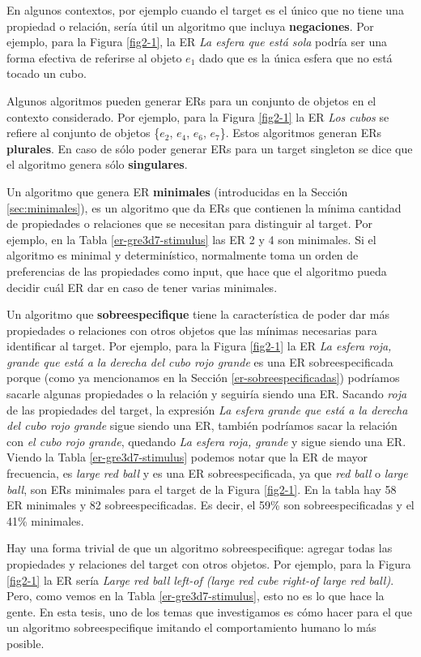 En algunos contextos, por ejemplo cuando el target es el \'unico que no tiene una propiedad o relaci\'on, ser\'ia \'util un algoritmo que incluya {\bf negaciones}. Por ejemplo, para la Figura \ref{fig2-1}, la ER {\it La esfera que est\'a sola} podr\'ia ser 
una forma efectiva de referirse al objeto $e_1$ dado que es la \'unica esfera que no est\'a tocado un cubo.

Algunos algoritmos pueden generar ERs para un conjunto de objetos en el contexto considerado. Por ejemplo, para la Figura \ref{fig2-1} la ER {\it Los cubos} se refiere  al conjunto de objetos \{$e_2$, $e_4$, $e_6$, $e_7$\}. Estos algoritmos generan ERs {\bf plurales}. En caso de s\'olo poder generar ERs para un target singleton se dice que el algoritmo genera s\'olo {\bf singulares}.

Un algoritmo que genera ER {\bf minimales} (introducidas en la Secci\'on \ref{sec:minimales}), es un algoritmo que da ERs que contienen la m\'inima cantidad de propiedades o relaciones que se necesitan para distinguir al target. Por ejemplo, en la Tabla \ref{er-gre3d7-stimulus} las ER 2 y 4 son minimales. Si el algoritmo es minimal y determin\'istico, normalmente toma un orden de preferencias de las propiedades como input, que hace que el algoritmo pueda decidir cu\'al ER dar en caso de tener varias minimales.

Un algoritmo que {\bf sobreespecifique} tiene la caracter\'istica de poder dar m\'as propiedades o relaciones con otros objetos que las m\'inimas necesarias para identificar al target. Por ejemplo, para la Figura \ref{fig2-1} la ER {\it La esfera roja, grande que est\'a a la derecha del cubo rojo grande} es una ER sobreespecificada porque (como ya mencionamos en la Secci\'on \ref{er-sobreespecificadas}) podr\'iamos sacarle algunas propiedades o la relaci\'on y seguir\'ia siendo una ER. Sacando {\it roja} de las propiedades del target, la expresi\'on {\it La esfera grande que est\'a a la derecha del cubo rojo grande} sigue siendo una ER, tambi\'en podr\'iamos sacar la relaci\'on con {\it el cubo rojo grande}, quedando {\it La esfera roja, grande} y sigue siendo una ER. Viendo la Tabla \ref{er-gre3d7-stimulus} podemos notar que la ER de mayor frecuencia, es {\it large red ball} y es una ER sobreespecificada, ya que {\it red ball} o {\it large ball}, son ERs minimales para el target de la Figura \ref{fig2-1}. En la tabla hay 58 ER minimales y 82 sobreespecificadas. Es decir, el 59\% son sobreespecificadas y el 41\% minimales.

Hay una forma trivial de que un algoritmo sobreespecifique: agregar todas las propiedades y relaciones del target con otros objetos. Por ejemplo, para la Figura \ref{fig2-1} la ER ser\'ia {\it Large red ball left-of (large red cube right-of large red ball)}. Pero, como vemos en la Tabla \ref{er-gre3d7-stimulus}, esto no es lo que hace la gente. En esta tesis, uno de los temas que investigamos es c\'omo hacer para el que un algoritmo sobreespecifique imitando el comportamiento humano lo m\'as posible. 


